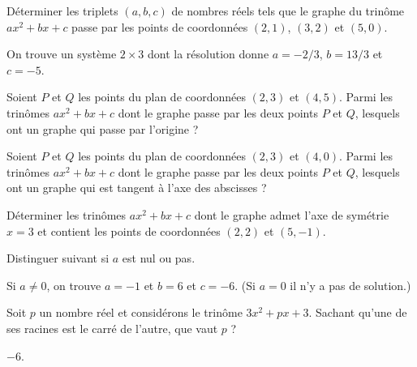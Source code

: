 \begin{exo}
Déterminer les triplets $(a,b,c)$ de nombres réels tels que le graphe du trinôme $ax^2+bx+c$ passe par les points de coordonnées $(2,1)$, $(3,2)$ et $(5,0)$.

\begin{hint}
\end{hint}
\begin{sol}
On trouve un système $2\times 3$ dont la résolution donne $a=-2/3$, $b=13/3$ et $c=-5$.
\end{sol}
\end{exo}

\begin{exo}
Soient $P$ et $Q$ les points du plan de coordonnées  $(2,3)$ et $(4,5)$.
Parmi les trinômes $ax^2+bx+c$ dont le graphe passe par les deux points $P$ et $Q$, lesquels ont un graphe qui passe par l'origine ?
\begin{hint}
\end{hint}
\begin{sol}
\end{sol}
\end{exo}

\begin{exo}
Soient $P$ et $Q$ les points du plan de coordonnées  $(2,3)$ et $(4,0)$.
Parmi les trinômes $ax^2+bx+c$ dont le graphe passe par les deux points $P$ et $Q$, lesquels ont un graphe qui est tangent à l'axe des abscisses ?
\begin{hint}
\end{hint}
\begin{sol}
\end{sol}
\end{exo}


\begin{exo}
Déterminer les trinômes $ax^2+bx+c$ dont le graphe admet l'axe de symétrie $x=3$ et contient les points de coordonnées $(2,2)$ et $(5,-1)$.
\begin{hint}
Distinguer suivant si $a$ est nul ou pas.
\end{hint}
\begin{sol}
Si $a\neq 0$, on trouve $a=-1$ et $b=6$ et $c=-6$. (Si $a=0$ il n'y a pas de solution.)
\end{sol}
\end{exo}

\begin{exo}
Soit $p$ un nombre réel et considérons le trinôme $3x^2+px+3$.
Sachant qu'une de ses racines est le carré de l'autre, que vaut $p$ ?
\begin{hint}
\end{hint}
\begin{sol}
$-6$.
\end{sol}
\end{exo}

